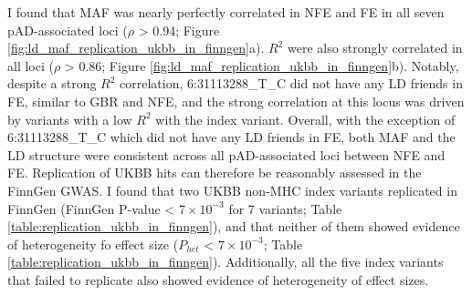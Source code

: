 I found that MAF was nearly perfectly correlated in NFE and FE in all seven pAD-associated loci ($\rho$ > 0.94; Figure \ref{fig:ld_maf_replication_ukbb_in_finngen}a). $R^{2}$ were also strongly correlated in all loci ($\rho$ > 0.86; Figure \ref{fig:ld_maf_replication_ukbb_in_finngen}b). Notably, despite a strong $R^{2}$ correlation, 6:31113288\_T\_C did not have any LD friends in FE, similar to GBR and NFE, and the strong correlation at this locus was driven by variants with a low $R^{2}$ with the index variant. Overall, with the exception of 6:31113288\_T\_C which did not have any LD friends in FE, both MAF and the LD structure were consistent across all pAD-associated loci between NFE and FE. Replication of UKBB hits can therefore be reasonably assessed in the FinnGen GWAS. I found that two UKBB non-MHC index variants replicated in FinnGen (FinnGen P-value < $7\times10^{-3}$ for 7 variants; Table \ref{table:replication_ukbb_in_finngen}), and that neither of them showed evidence of heterogeneity fo effect size ($P_{het}$ < $7\times10^{-3}$; Table \ref{table:replication_ukbb_in_finngen}). Additionally, all the five index variants that failed to replicate also showed evidence of heterogeneity of effect sizes.


